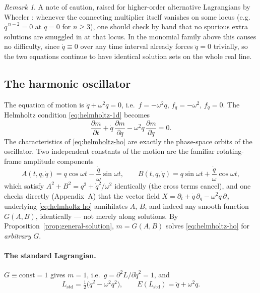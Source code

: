 \documentclass[11pt]{article}
\theoremstyle{remark}
\newtheorem{remark}{Remark}[section]
\begin{document}
\begin{remark}
A note of caution, raised for higher-order alternative Lagrangians by Wheeler \cite{Wheeler2005}: whenever the connecting multiplier itself vanishes on some locus (e.g.\ $\dot q^{\,n-2}=0$ at $\dot q=0$ for $n\geq 3$), one should check by hand that no spurious extra solutions are smuggled in at that locus. In the monomial family above this causes no difficulty, since $\dot q\equiv 0$ over any time interval already forces $\ddot q=0$ trivially, so the two equations continue to have identical solution sets on the whole real line.
\end{remark}

\subsection{The harmonic oscillator}
\label{sec:ho}

The equation of motion is $\ddot q+\omega^2 q=0$, i.e.\ $f=-\omega^2 q$, $f_q=-\omega^2$, $f_{\dot q}=0$. The Helmholtz condition \eqref{eq:helmholtz-1d} becomes
\begin{equation}
\frac{\partial m}{\partial t}+\dot q\,\frac{\partial m}{\partial q}-\omega^2 q\,\frac{\partial m}{\partial \dot q}=0 .
\label{eq:helmholtz-ho}
\end{equation}
The characteristics of \eqref{eq:helmholtz-ho} are exactly the phase-space orbits of the oscillator. Two independent constants of the motion are the familiar rotating-frame amplitude components
\begin{equation}
A(t,q,\dot q)=q\cos\omega t-\frac{\dot q}{\omega}\sin\omega t, \qquad B(t,q,\dot q)=q\sin\omega t+\frac{\dot q}{\omega}\cos\omega t ,
\end{equation}
which satisfy $A^2+B^2=q^2+\dot q^2/\omega^2$ identically (the cross terms cancel), and one checks directly (Appendix~A) that the vector field $X=\partial_t+\dot q\,\partial_q-\omega^2 q\,\partial_{\dot q}$ underlying \eqref{eq:helmholtz-ho} annihilates $A$, $B$, and indeed any smooth function $G(A,B)$, identically --- not merely along solutions. By Proposition~\ref{prop:general-solution}, $m=G(A,B)$ solves \eqref{eq:helmholtz-ho} for \emph{arbitrary} $G$.

\paragraph{The standard Lagrangian.} $G\equiv \mathrm{const}=1$ gives $m=1$, i.e.\ $g=\partial^2 L/\partial \dot q^2=1$, and
\begin{equation}
L_{\mathrm{std}} = \tfrac12\big(\dot q^2-\omega^2 q^2\big), \qquad E(L_{\mathrm{std}})=\ddot q+\omega^2 q .
\end{equation}
\end{document}
